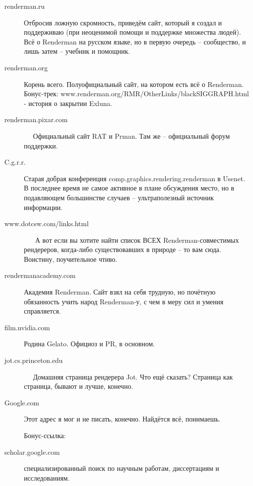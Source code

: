 	\begin{description}
  
		\item [     renderman.ru    ]
      Отбросив ложную скромность, приведём сайт, который я создал и
      поддерживаю (при неоценимой помощи и поддержке множества людей).
      Всё о Renderman на русском языке, но в первую очередь – сообщество,
      и лишь затем – учебник и помощник.

		\item [     renderman.org    ]
      Корень всего. Полуофициальный  сайт, на котором есть всё о
      Renderman. Бонус-трек:
      www.renderman.org/RMR/OtherLinks/blackSIGGRAPH.html - история о
      закрытии Exluna.

		\item [     renderman.pixar.com ]   
      Официальный сайт RAT и Prman. Там же – официальный форум
      поддержки.

		\item [     C.g.r.r.     ]
      Старая добрая конференция comp.graphics.rendering.renderman в
      Usenet. В последнее время не самое активное в плане обсуждения
      место, но в подавляющем большинстве случаев – ультраполезный
      источник информации.

		\item [     www.dotcsw.com/links.html ]     
      А вот если вы хотите найти список ВСЕХ Renderman-совместимых
      рендереров, когда-либо существовавших в природе – то вам сюда.
      Воистину, поучительное чтиво.

		\item [     rendermanacademy.com    ]
      Академия Renderman. Сайт взял на себя трудную, но почётную
      обязанность учить народ Renderman-у, с чем в меру сил и умения
      справляется.

		\item [     film.nvidia.com    ]
      Родина Gelato. Официоз и PR, в основном.

		\item [     jot.cs.princeton.edu ]   
       Домашняя
      страница рендерера Jot. Что ещё сказать? Страница как страница,
      бывают и лучше, конечно.

 		\item [    Google.com     ]
      Этот адрес я мог и не писать, конечно. Найдётся всё, понимаешь.

      Бонус-ссылка: 		

\item [scholar.google.com ]
      специализированный поиск по научным работам, диссертациям и
      исследованиям.

\end{description}


